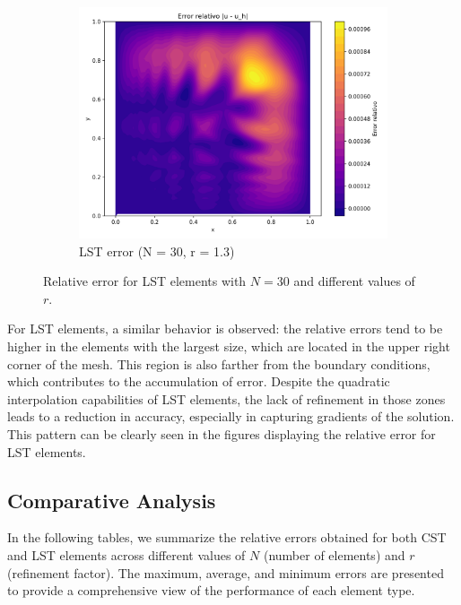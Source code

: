 \documentclass[12pt]{article}
\begin{document}
\begin{figure}[H]
    \hfill
    \begin{subfigure}[t]{0.32\textwidth}
        \centering
        \includegraphics[width=\textwidth]{Graficos/33/LST_relative_error_colormap.png}
        \caption{LST error (N = 30, r = 1.3)}
        \label{fig:lst_error_r1.3_n30}
    \end{subfigure}
    \caption{Relative error for LST elements with $N = 30$ and different values of $r$.}
    \label{fig:lst_error_comparison_n30}
\end{figure}

For LST elements, a similar behavior is observed: the relative errors tend to be higher in the elements with the largest size, which are located in the upper right corner of the mesh. This region is also farther from the boundary conditions, which contributes to the accumulation of error. Despite the quadratic interpolation capabilities of LST elements, the lack of refinement in those zones leads to a reduction in accuracy, especially in capturing gradients of the solution. This pattern can be clearly seen in the figures displaying the relative error for LST elements.

\subsection{Comparative Analysis}

In the following tables, we summarize the relative errors obtained for both CST and LST elements across different values of $N$ (number of elements) and $r$ (refinement factor). The maximum, average, and minimum errors are presented to provide a comprehensive view of the performance of each element type.
\end{document}
